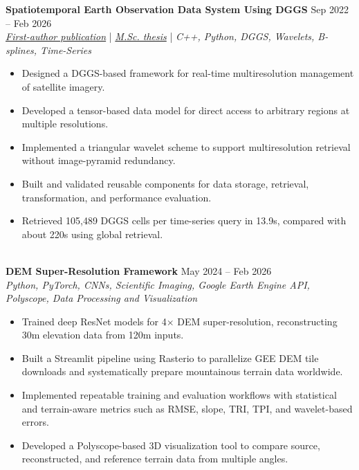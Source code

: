 \documentclass[a4paper,10pt]{article}
\begin{document}
\noindent
\textbf{Spatiotemporal Earth Observation Data System Using DGGS} \hfill Sep 2022 -- Feb 2026 \\
\textit{\href{https://doi.org/10.3390/rs17040570}{First-author publication}} | \textit{\href{https://ucalgary.scholaris.ca/items/114b394b-e516-4732-bd3a-45dd6160d480}{M.Sc. thesis}} | \textit{C++, Python, DGGS, Wavelets, B-splines, Time-Series}
\begin{itemize}[leftmargin=0.25in]
    \item Designed a DGGS-based framework for real-time multiresolution management of satellite imagery.
    \item Developed a tensor-based data model for direct access to arbitrary regions at multiple resolutions.
    \item Implemented a triangular wavelet scheme to support multiresolution retrieval without image-pyramid redundancy.
    \item Built and validated reusable components for data storage, retrieval, transformation, and performance evaluation.
    \item Retrieved 105,489 DGGS cells per time-series query in 13.9s, compared with about 220s using global retrieval.
\end{itemize}

\noindent \\
\textbf{DEM Super-Resolution Framework} \hfill May 2024 -- Feb 2026 \\
\textit{Python, PyTorch, CNNs, Scientific Imaging, Google Earth Engine API, Polyscope, Data Processing and Visualization}
\begin{itemize}[leftmargin=0.25in]
    \item Trained deep ResNet models for 4$\times$ DEM super-resolution, reconstructing 30m elevation data from 120m inputs.
    \item Built a Streamlit pipeline using Rasterio to parallelize GEE DEM tile downloads and systematically prepare mountainous terrain data worldwide.
    \item Implemented repeatable training and evaluation workflows with statistical and terrain-aware metrics such as RMSE, slope, TRI, TPI, and wavelet-based errors.
    \item Developed a Polyscope-based 3D visualization tool to compare source, reconstructed, and reference terrain data from multiple angles.
\end{itemize}
\end{document}
